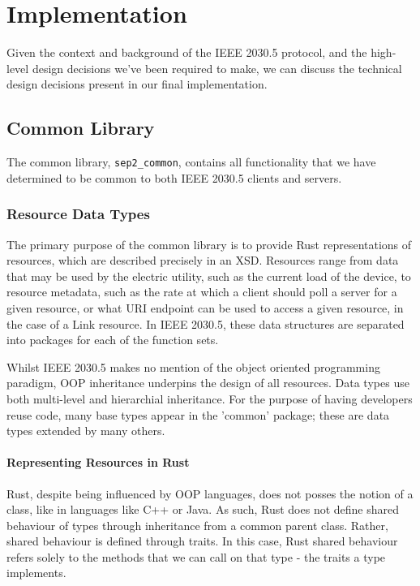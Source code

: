 \chapter{Implementation}\label{ch:implementation}
Given the context and background of the IEEE 2030.5 protocol, and the high-level design decisions we've been required to make, we can discuss the technical design decisions present in our final implementation.

\section{Common Library}
The common library, \texttt{sep2\_common}, contains all functionality that we have determined to be common to both IEEE 2030.5 clients and servers.

\subsection{Resource Data Types}
The primary purpose of the common library is to provide Rust representations of resources, which are described precisely in an XSD.
Resources range from data that may be used by the electric utility, such as the current load of the device, to resource metadata, such as the rate at which a client should poll a server for a given resource, or what URI endpoint can be used to access a given resource, in the case of a Link resource.
In IEEE 2030.5, these data structures are separated into packages for each of the function sets.

Whilst IEEE 2030.5 makes no mention of the object oriented programming paradigm, OOP inheritance underpins the design of all resources. Data types use both multi-level and hierarchial inheritance.
For the purpose of having developers reuse code, many base types appear in the 'common' package; these are data types extended by many others.

\subsubsection{Representing Resources in Rust}
Rust, despite being influenced by OOP languages, does not posses the notion of a class, like in languages like C++ or Java. As such, Rust does not define shared behaviour of types through inheritance from a common parent class. 
Rather, shared behaviour is defined through traits. In this case, Rust shared behaviour refers solely to the methods that we can call on that type - the traits a type implements.


